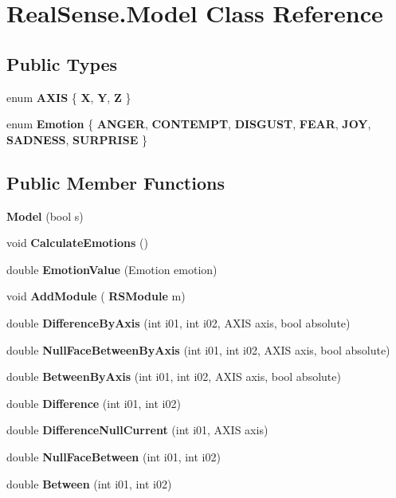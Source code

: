 \section{Real\+Sense.\+Model Class Reference}
\label{class_real_sense_1_1_model}
\subsection*{Public Types}
\begin{DoxyCompactItemize}
\item 
\mbox{\label{class_real_sense_1_1_model_ab1d8b9992dae2162c48b52f6694f946b}} 
enum {\bfseries A\+X\+IS} \{ {\bfseries X}, 
{\bfseries Y}, 
{\bfseries Z}
 \}
\item 
\mbox{\label{class_real_sense_1_1_model_a5bf3fde8f53519f7a740d8b4e0399208}} 
enum {\bfseries Emotion} \{ \newline
{\bfseries A\+N\+G\+ER}, 
{\bfseries C\+O\+N\+T\+E\+M\+PT}, 
{\bfseries D\+I\+S\+G\+U\+ST}, 
{\bfseries F\+E\+AR}, 
\newline
{\bfseries J\+OY}, 
{\bfseries S\+A\+D\+N\+E\+SS}, 
{\bfseries S\+U\+R\+P\+R\+I\+SE}
 \}
\end{DoxyCompactItemize}
\subsection*{Public Member Functions}
\begin{DoxyCompactItemize}
\item 
\textbf{ Model} (bool s)
\item 
void \textbf{ Calculate\+Emotions} ()
\item 
\mbox{\label{class_real_sense_1_1_model_a078b1ddb43e777aa73c1b3898722e4bb}} 
double {\bfseries Emotion\+Value} (Emotion emotion)
\item 
void \textbf{ Add\+Module} (\textbf{ R\+S\+Module} m)
\item 
double \textbf{ Difference\+By\+Axis} (int i01, int i02, A\+X\+IS axis, bool absolute)
\item 
double \textbf{ Null\+Face\+Between\+By\+Axis} (int i01, int i02, A\+X\+IS axis, bool absolute)
\item 
double \textbf{ Between\+By\+Axis} (int i01, int i02, A\+X\+IS axis, bool absolute)
\item 
double \textbf{ Difference} (int i01, int i02)
\item 
\mbox{\label{class_real_sense_1_1_model_a69d8b360ed9c9ddaa19a0619df408e2a}} 
double {\bfseries Difference\+Null\+Current} (int i01, A\+X\+IS axis)
\item 
double \textbf{ Null\+Face\+Between} (int i01, int i02)
\item 
double \textbf{ Between} (int i01, int i02)
\end{DoxyCompactItemize}
